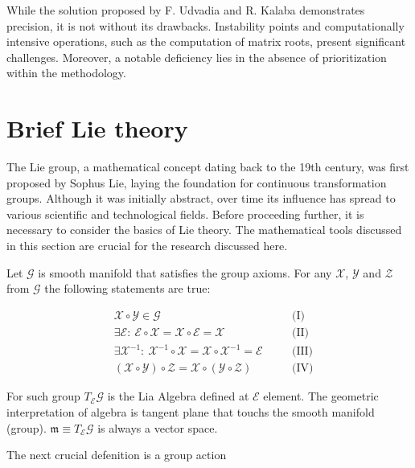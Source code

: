 While the solution proposed by F. Udvadia and R. Kalaba demonstrates precision, 
it is not without its drawbacks. Instability points and computationally intensive 
operations, such as the computation of matrix roots, present significant challenges. 
Moreover, a notable deficiency lies in the absence of prioritization within the 
methodology.

\section{Brief Lie theory}

The Lie group, a mathematical concept dating back to the 19th century, was first 
proposed by Sophus Lie, laying the foundation for continuous transformation groups. 
Although it was initially abstract, over time its influence has spread to various 
scientific and technological fields. Before proceeding further, it is necessary to 
consider the basics of Lie theory. The mathematical tools discussed in this section 
are crucial for the research discussed here.

Let $\mathcal{G}$ is smooth manifold that satisfies the group axioms. For any 
$\mathcal{X}$, $\mathcal{Y}$ and $\mathcal{Z}$ from $\mathcal{G}$ the following 
statements are true:

\begin{equation}
    \begin{aligned}
        \label{eqn:g_axi}
        & \mathcal{X} \circ \mathcal{Y} \in \mathcal{G} \quad && \text{(I)} \\
        & \exists \mathcal{E}:\ \mathcal{E} \circ \mathcal{X} 
        = \mathcal{X} \circ \mathcal{E} = \mathcal{X} \quad && \text{(II)} \\
        & \exists \mathcal{X}^{-1}:\ \mathcal{X}^{-1} \circ \mathcal{X}
        = \mathcal{X} \circ \mathcal{X}^{-1} = \mathcal{E} \quad && \text{(III)} \\ 
        & (\mathcal{X} \circ \mathcal{Y}) \circ \mathcal{Z} = 
        \mathcal{X} \circ (\mathcal{Y} \circ \mathcal{Z}) \quad && \text{(IV)}
    \end{aligned}
\end{equation}

For such group $T_{\mathcal{E}} \mathcal{G}$ is the Lia Algebra defined at 
$\mathcal{E}$ element. The geometric interpretation of algebra is tangent plane 
that touchs the smooth manifold (group). $\mathfrak{m} \equiv 
T_{\mathcal{E}} \mathcal{G}$ is always a vector space.

The next crucial defenition is a group action

